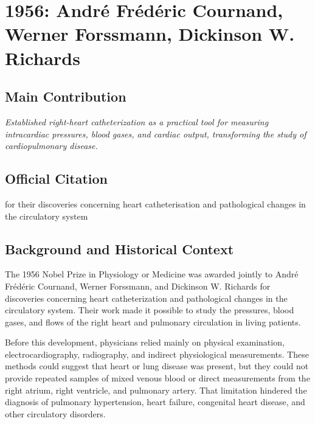 \chapter[1956 --- Cournand, Forssmann, and Richards]{1956: Andr\'e Fr\'ed\'eric Cournand, Werner Forssmann, Dickinson W. Richards}
\label{ch:1956_Cournand}

\section*{Main Contribution}

\textit{Established right-heart catheterization as a practical tool for measuring intracardiac pressures, blood gases, and cardiac output, transforming the study of cardiopulmonary disease.}\cite{nobel-1956,lecture-1956,lecture-richards-1956}

\section{Official Citation}

for their discoveries concerning heart catheterisation and pathological changes in the circulatory system

\section{Background and Historical Context}

The 1956 Nobel Prize in Physiology or Medicine was awarded jointly to Andr\'e Fr\'ed\'eric Cournand, Werner Forssmann, and Dickinson W. Richards for discoveries concerning heart catheterization and pathological changes in the circulatory system. Their work made it possible to study the pressures, blood gases, and flows of the right heart and pulmonary circulation in living patients.

Before this development, physicians relied mainly on physical examination, electrocardiography, radiography, and indirect physiological measurements. These methods could suggest that heart or lung disease was present, but they could not provide repeated samples of mixed venous blood or direct measurements from the right atrium, right ventricle, and pulmonary artery. That limitation hindered the diagnosis of pulmonary hypertension, heart failure, congenital heart disease, and other circulatory disorders.

